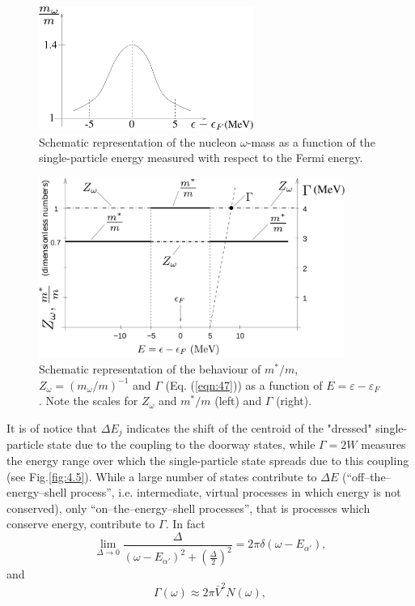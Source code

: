 \begin{figure}[h!]
\centerline {
\includegraphics*[width=7cm]{introduccion/figs/figintroD3}
}
\caption{Schematic representation of the nucleon $\omega$-mass as a function of the single-particle energy measured with respect to the Fermi energy.}
\label{fig:4.3}
\end{figure}

\begin{figure}[h!]
\centerline {
\includegraphics*[width=10cm]{introduccion/figs/figintroD4}
}
\caption[Schematic representation of the behaviour of $m^*/m$, $Z_{\omega}=(m_{\omega}/m)^{-1}$ and $\Gamma$.]{Schematic representation of the behaviour of $m^*/m$, $Z_{\omega}=(m_{\omega}/m)^{-1}$ and $\Gamma$ (Eq. (\ref{eqn:47}))  as a function of $E = \varepsilon - \varepsilon_F$. Note the scales for $Z_\omega$ and $m^*/m$ (left) and $\Gamma$ (right).}
\label{fig:4.4}
\end{figure}


It is of notice that $\Delta E_j$ indicates the shift  of the  centroid of the "dressed" single-particle state due to the coupling to the  doorway states, while $\Gamma = 2W$ measures the energy range over which the single-particle state spreads due to this coupling (see Fig.\ref{fig:4.5}). While a large number of states contribute to $\Delta E$ (``off--the--energy--shell process'', i.e. intermediate, virtual processes in which energy is not conserved), only ``on--the--energy--shell processes'', that is processes which conserve  energy, contribute to $\Gamma$. In fact
\begin{equation}
\nonumber
\lim_{\Delta \rightarrow 0} \frac{\Delta}{(\omega -E_{\alpha'})^2 + \left( \frac{\Delta}{2} \right)^2} = 2\pi\delta(\omega-E_{\alpha'}) ,
\end{equation}
and
\begin{equation}
\Gamma(\omega) \approx 2\pi \bar{V}^2 N(\omega) ,
\label{eqn:41}
\end{equation}

